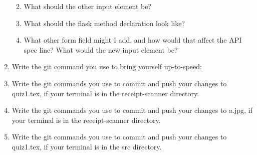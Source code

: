 \documentclass[12pt,letterpaper]{article}
\begin{document}
\begin{enumerate}
\begin{enumerate}
				 \vspace{4cm}
			 \item What should the other input element be?
				 \vspace{4cm}
			 \item What should the flask method declaration
				 look like?
				 \vspace{4cm}
			 \item What other form field might I add, and how
				 would that affect the API spec line?
				 What would the new input element be?
				 \vspace{4cm}
		 \end{enumerate}
	 \item Write the git command you use to bring yourself up-to-speed:
		 \vspace{1cm}
	 \item Write the git commands you use to commit and push your changes to
		 quiz1.tex, if your terminal is in the receipt-scanner directory.
		 \vspace{4cm}
	 \item Write the git commands you use to commit and push your changes to
		 a.jpg, if your terminal is in the receipt-scanner directory.
		 \vspace{4cm}
	 \item Write the git commands you use to commit and push your changes to
		 quiz1.tex, if your terminal is in the src directory.
		 \vspace{4cm}
\end{enumerate}
\end{document}
